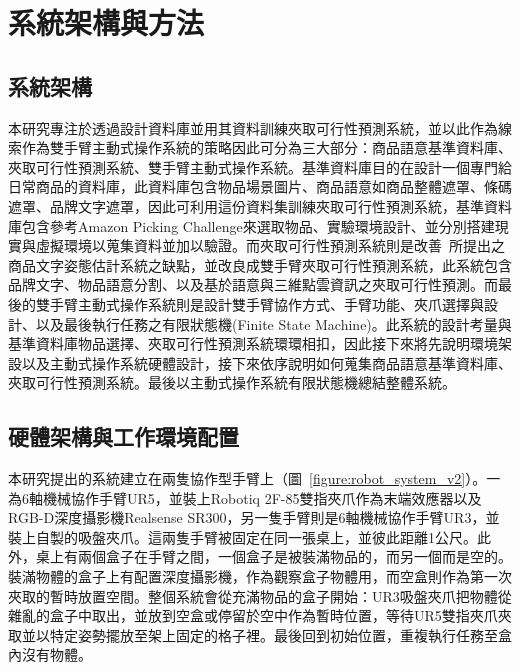 \chapter{系統架構與方法}
\label{chapter:system}



\section{系統架構}
\label{sec:systemarchi}
本研究專注於透過設計資料庫並用其資料訓練夾取可行性預測系統，並以此作為線索作為雙手臂主動式操作系統的策略因此可分為三大部分：商品語意基準資料庫、夾取可行性預測系統、雙手臂主動式操作系統。基準資料庫目的在設計一個專門給日常商品的資料庫，此資料庫包含物品場景圖片、商品語意如商品整體遮罩、條碼遮罩、品牌文字遮罩，因此可利用這份資料集訓練夾取可行性預測系統，基準資料庫包含參考Amazon Picking Challenge來選取物品、實驗環境設計、並分別搭建現實與虛擬環境以蒐集資料並加以驗證。而夾取可行性預測系統則是改善~\cite{peterthesis}所提出之商品文字姿態估計系統之缺點，並改良成雙手臂夾取可行性預測系統，此系統包含品牌文字、物品語意分割、以及基於語意與三維點雲資訊之夾取可行性預測。而最後的雙手臂主動式操作系統則是設計雙手臂協作方式、手臂功能、夾爪選擇與設計、以及最後執行任務之有限狀態機(Finite State Machine)。此系統的設計考量與基準資料庫物品選擇、夾取可行性預測系統環環相扣，因此接下來將先說明環境架設以及主動式操作系統硬體設計，接下來依序說明如何蒐集商品語意基準資料庫、夾取可行性預測系統。最後以主動式操作系統有限狀態機總結整體系統。

\section{硬體架構與工作環境配置}
本研究提出的系統建立在兩隻協作型手臂上（圖~\ref{figure:robot_system_v2}）。一為6軸機械協作手臂UR5，並裝上Robotiq 2F-85雙指夾爪作為末端效應器以及RGB-D深度攝影機Realsense SR300，另一隻手臂則是6軸機械協作手臂UR3，並裝上自製的吸盤夾爪。這兩隻手臂被固定在同一張桌上，並彼此距離1公尺。此外，桌上有兩個盒子在手臂之間，一個盒子是被裝滿物品的，而另一個而是空的。裝滿物體的盒子上有配置深度攝影機，作為觀察盒子物體用，而空盒則作為第一次夾取的暫時放置空間。整個系統會從充滿物品的盒子開始：UR3吸盤夾爪把物體從雜亂的盒子中取出，並放到空盒或停留於空中作為暫時位置，等待UR5雙指夾爪夾取並以特定姿勢擺放至架上固定的格子裡。最後回到初始位置，重複執行任務至盒內沒有物體。

